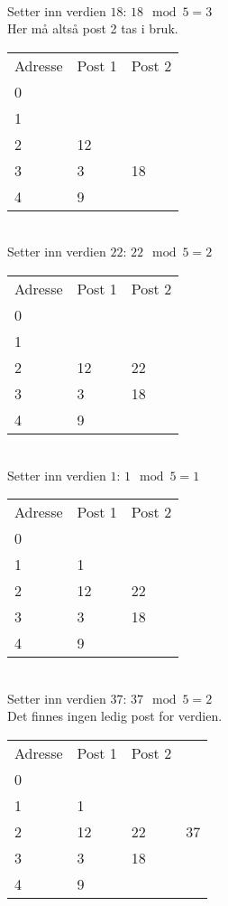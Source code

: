 \documentclass[a4paper, 12pt] {article}
\begin{document}
~\\
Setter inn verdien $18$: $18 \mod 5 = 3$\\
Her må altså post 2 tas i bruk.\\
\begin{tabular}{|l|l|l|}
    \hline
    Adresse & Post 1 & Post 2 \\
    0       & ~      & ~      \\
    1       & ~      & ~      \\
    2       & 12     & ~      \\
    3       & 3      & 18      \\
    4       & 9      & ~      \\ \hline
\end{tabular}

~\\
Setter inn verdien $22$: $22 \mod 5 = 2$\\
\begin{tabular}{|l|l|l|}
    \hline
    Adresse & Post 1 & Post 2 \\
    0       & ~      & ~      \\
    1       & ~      & ~      \\
    2       & 12     & 22     \\
    3       & 3      & 18     \\
    4       & 9      & ~      \\ \hline
\end{tabular}

~\\
Setter inn verdien $1$: $1 \mod 5 = 1$\\
\begin{tabular}{|l|l|l|}
    \hline
    Adresse & Post 1 & Post 2 \\
    0       & ~      & ~      \\
    1       & 1      & ~      \\
    2       & 12     & 22     \\
    3       & 3      & 18     \\
    4       & 9      & ~      \\ \hline
\end{tabular}

~\\
Setter inn verdien $37$: $37 \mod 5 = 2$\\
Det finnes ingen ledig post for verdien.\\
\begin{tabular}{|l|l|l|l}
    \hline
    Adresse & Post 1 & Post 2	& ~ \\
    0       & ~      & ~      \\
    1       & 1      & ~      \\
    2       & 12     & 22	& 37 \\
    3       & 3      & 18     \\
    4       & 9      & ~      \\ \hline
\end{tabular}
\end{document}
